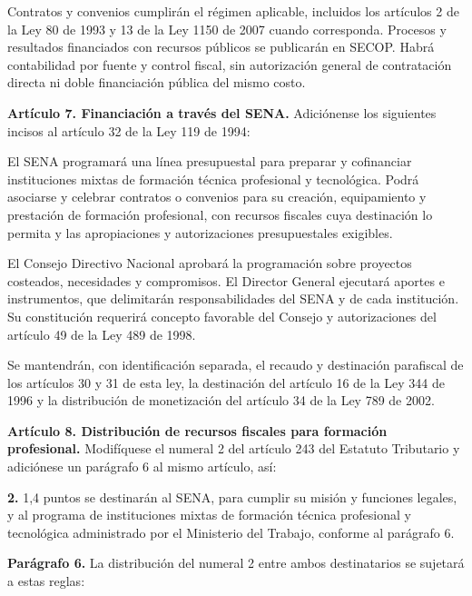 \begin{mdframed}[linewidth=0.6pt,linecolor=gray!60,backgroundcolor=gray!3,
  innertopmargin=10pt,innerbottommargin=10pt,innerleftmargin=10pt,innerrightmargin=10pt]
Contratos y convenios cumplirán el régimen aplicable, incluidos los artículos 2 de la Ley 80 de 1993 y 13 de la Ley 1150 de 2007 cuando corresponda. Procesos y resultados financiados con recursos públicos se publicarán en SECOP. Habrá contabilidad por fuente y control fiscal, sin autorización general de contratación directa ni doble financiación pública del mismo costo.

\textbf{Artículo 7. Financiación a través del SENA.} Adiciónense los siguientes incisos al artículo 32 de la Ley 119 de 1994:

El SENA programará una línea presupuestal para preparar y cofinanciar instituciones mixtas de formación técnica profesional y tecnológica. Podrá asociarse y celebrar contratos o convenios para su creación, equipamiento y prestación de formación profesional, con recursos fiscales cuya destinación lo permita y las apropiaciones y autorizaciones presupuestales exigibles.

El Consejo Directivo Nacional aprobará la programación sobre proyectos costeados, necesidades y compromisos. El Director General ejecutará aportes e instrumentos, que delimitarán responsabilidades del SENA y de cada institución. Su constitución requerirá concepto favorable del Consejo y autorizaciones del artículo 49 de la Ley 489 de 1998.

Se mantendrán, con identificación separada, el recaudo y destinación parafiscal de los artículos 30 y 31 de esta ley, la destinación del artículo 16 de la Ley 344 de 1996 y la distribución de monetización del artículo 34 de la Ley 789 de 2002.

\textbf{Artículo 8. Distribución de recursos fiscales para formación profesional.} Modifíquese el numeral 2 del artículo 243 del Estatuto Tributario y adiciónese un parágrafo 6 al mismo artículo, así:

\textbf{2.} 1,4 puntos se destinarán al SENA, para cumplir su misión y funciones legales, y al programa de instituciones mixtas de formación técnica profesional y tecnológica administrado por el Ministerio del Trabajo, conforme al parágrafo 6.

\textbf{Parágrafo 6.} La distribución del numeral 2 entre ambos destinatarios se sujetará a estas reglas:


\end{mdframed}
